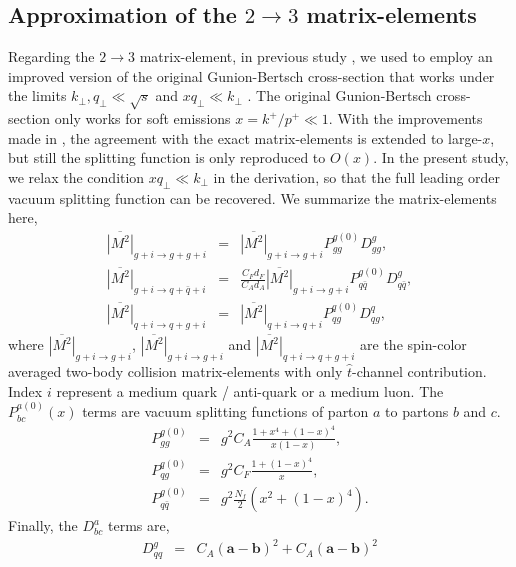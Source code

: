 \documentclass[aps, prc, reprint, amsmath, groupedaddress, nofootinbib]{revtex4-1}
\begin{document}
\begin{appendices}
\section{Approximation of the $2\rightarrow 3$ matrix-elements}
\label{app:23}
Regarding the $2\rightarrow 3$ matrix-element, in previous study \cite{Ke:2018tsh}, we used to employ an improved version of the original Gunion-Bertsch cross-section that works under the limits $k_\perp, q_\perp \ll \sqrt{s}$ and $x q_\perp \ll k_\perp$ \cite{PhysRevD.25.746,Fochler:2013epa,Uphoff:2014hza}.
The original Gunion-Bertsch cross-section \cite{PhysRevD.25.746} only works for soft emissions $x=k^+/p^+ \ll 1$. 
With the improvements made in \cite{Fochler:2013epa,Uphoff:2014hza}, the agreement with the exact matrix-elements is extended to large-$x$, but still the splitting function is only reproduced to $O(x)$.
In the present study, we relax the condition $x q_\perp \ll k_\perp$ in the derivation, so that the full leading order vacuum splitting function can be recovered.
We summarize the matrix-elements here,
\begin{eqnarray}
\overline{|M^2|}_{g+i\rightarrow g+g+i} &=& \overline{|M^2|}_{g+i\rightarrow g+i} P_{gg}^{g(0)}  D_{gg}^{g},\\
\overline{|M^2|}_{g+i\rightarrow q+\bar{q}+i} &=& \frac{C_F d_F}{C_A d_A}\overline{|M^2|}_{g+i\rightarrow g+i} P_{q\bar{q}}^{g(0)} D_{q\bar{q}}^{g},\\
\overline{|M^2|}_{q+i\rightarrow q+g+i} &=& \overline{|M^2|}_{q+i\rightarrow q+i} P_{qg}^{q(0)} D_{qg}^{q},
\end{eqnarray}
where $\overline{|M^2|}_{g+i\rightarrow g+i}$, $\overline{|M^2|}_{g+i\rightarrow g+i}$ and $\overline{|M^2|}_{q+i\rightarrow q+g+i}$ are the spin-color averaged two-body collision matrix-elements with only $\hat{t}$-channel contribution.
Index $i$ represent a medium quark / anti-quark or a medium luon.
The $P_{bc}^{a(0)}(x)$ terms are vacuum splitting functions of parton $a$ to partons $b$ and $c$. 
\begin{eqnarray}
P_{gg}^{g(0)}  &=& g^2  C_A\frac{1+x^4+(1-x)^4}{x(1-x)},\\
P_{qg}^{q(0)} &=& g^2  C_F\frac{1+(1-x)^4}{x},\\
P_{q\bar{q}}^{g(0)} &=& g^2  \frac{N_f}{2}\left(x^2+(1-x)^4\right).
\end{eqnarray}
Finally, the $D_{bc}^{a}$ terms are,
\begin{eqnarray}
D_{qq}^{g} &=& 
C_A(\mathbf{a}-\mathbf{b})^2 + C_A(\mathbf{a}-\mathbf{b})^2 \\\nonumber

\end{eqnarray}
\end{appendices}
\end{document}
